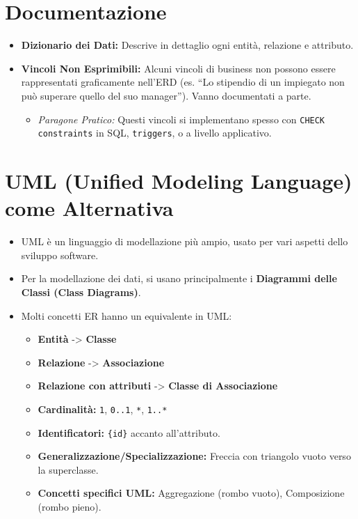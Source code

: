 \documentclass{article}
\begin{document}
	\section{Documentazione}
	\begin{itemize}
		\item \textbf{Dizionario dei Dati:} Descrive in dettaglio ogni entità, relazione e attributo.
		\item \textbf{Vincoli Non Esprimibili:} Alcuni vincoli di business non possono essere rappresentati graficamente nell'ERD (es. ``Lo stipendio di un impiegato non può superare quello del suo manager''). Vanno documentati a parte.
		\begin{itemize}
			\item \textit{Paragone Pratico:} Questi vincoli si implementano spesso con \texttt{CHECK constraints} in SQL, \texttt{triggers}, o a livello applicativo.
		\end{itemize}
	\end{itemize}
	
	\section{UML (Unified Modeling Language) come Alternativa}
	\begin{itemize}
		\item UML è un linguaggio di modellazione più ampio, usato per vari aspetti dello sviluppo software.
		\item Per la modellazione dei dati, si usano principalmente i \textbf{Diagrammi delle Classi (Class Diagrams)}.
		\item Molti concetti ER hanno un equivalente in UML:
		\begin{itemize}
			\item \textbf{Entità} -> \textbf{Classe}
			\item \textbf{Relazione} -> \textbf{Associazione}
			\item \textbf{Relazione con attributi} -> \textbf{Classe di Associazione}
			\item \textbf{Cardinalità:} \texttt{1}, \texttt{0..1}, \texttt{*}, \texttt{1..*}
			\item \textbf{Identificatori:} \texttt{\{id\}} accanto all'attributo.
			\item \textbf{Generalizzazione/Specializzazione:} Freccia con triangolo vuoto verso la superclasse.
			\item \textbf{Concetti specifici UML:} Aggregazione (rombo vuoto), Composizione (rombo pieno).
		\end{itemize}
	\end{itemize}
	
\end{document}

